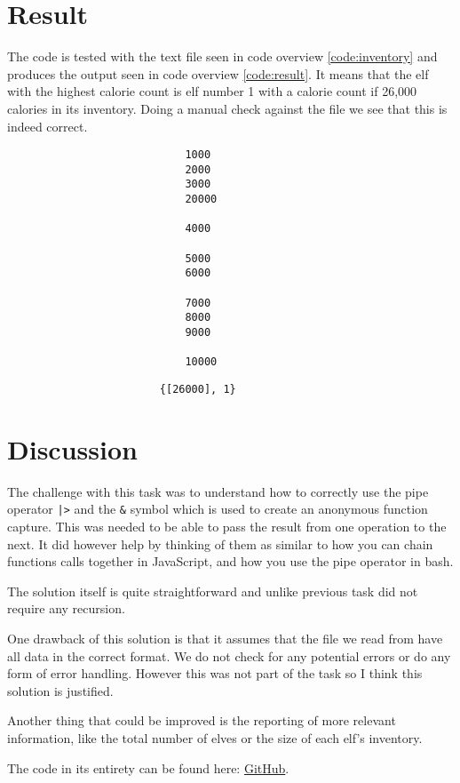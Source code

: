 \documentclass[a4paper,11pt]{article}
\newenvironment{code}{\captionsetup{type=listing}}{}
\begin{document}
\section*{Result}
The code is tested with the text file seen in code overview \ref{code:inventory} and 
produces the output seen in code overview \ref{code:result}. It means that the elf with 
the highest calorie count is elf number 1 with a calorie count if 26,000 calories in its 
inventory. Doing a manual check against the file we see that this is indeed correct.\\
\begin{code}
\label{code:inventory}
\begin{verbatim}
                            1000
                            2000
                            3000
                            20000

                            4000

                            5000
                            6000

                            7000
                            8000
                            9000

                            10000
\end{verbatim}
\end{code}
\begin{code}
\label{code:result}
\begin{verbatim}
                        {[26000], 1}
\end{verbatim}
\end{code}

\section*{Discussion}
The challenge with this task was to understand how to correctly use the pipe operator 
{\tt |>} and the {\tt \&} symbol which is used to create an anonymous function capture.
This was needed to be able to pass the result from one operation to the next. It did 
however help by thinking of them as similar to how you can chain functions calls together 
in JavaScript, and how you use the pipe operator in bash.

The solution itself is quite straightforward and unlike previous task did not require any 
recursion. 

One drawback of this solution is that it assumes that the file we read from 
have all data in the correct format. We do not check for any potential errors or do any 
form of error handling. However this was not part of the task so I think this solution is 
justified.

Another thing that could be improved is the reporting of more relevant information, like
the total number of elves or the size of each elf's inventory.

The code in its entirety can be found here:
\href{https://github.com/adrian-jonsson-sjoedin/ID1019-Programming-II/tree/main/Task5_Solution}{GitHub}.
\end{document}
